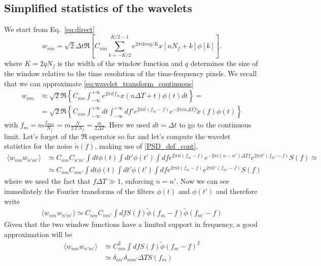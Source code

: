 \documentclass{article}
\begin{document}
\subsection{Simplified statistics of the wavelets}
We start from Eq.~\eqref{eq:direct}
\begin{equation}
w_{n m}=\sqrt{2} \Delta t \Re \left[C_{n m} \sum_{k=-K / 2}^{K / 2-1} e^{2\pi i k m q / K} x\left[n N_f+k\right] \phi[k]\right].
\end{equation}
where $K = 2q N_f$ is the width of the window function and $q$ determines the size of the window relative to the time resolution of the time-frequency pixels. We recall that we can approximate
\eqref{eq:wavelet_transform_continuous}
%
\begin{align}
w_{n m} &\approx \sqrt{2} \Re \left\{C_{n m} \int_{-\infty}^{+\infty} e^{2 \pi i t f_{m}} x(n \Delta T + t) \phi(t) dt\right\}=\nonumber\\
&=\sqrt{2} \Re \left\{C_{n m} \int_{-\infty}^{+\infty}dt\int_{-\infty}^{+\infty}df' e^{2 \pi i t (f_{m}-f)} e^{-2 \pi i n\Delta T f} \tilde x(f) \phi(t)\right\}
\end{align}
%
with $f_{m} = m\frac{f_{max}}{N_f}=m\frac{N}{2\,T\,N_f}=\frac{m}{2\Delta T}$. Here we used $dt=\Delta t$ to go to the continuous limit. Let's forget of the $\Re$ operator so far and let's compute the wavelet statistics for the noise $\tilde n(f)$, making use of \eqref{PSD_def_cont},
%
\begin{align}
\langle w_{n m}w_{n'm'}\rangle&\simeq C_{n m}C_{n'm'}\int dt\phi(t) \int dt' \phi(t')\int df e^{2 \pi i t (f_{m}-f)} e^{-2 \pi i (n-n')\Delta T f} e^{2 \pi i t' (f_{m'}-f)} S(f)\simeq\nonumber\\
&\simeq C_{n m}C_{nm'}\int dt\phi(t) \int dt' \phi(t')\int df e^{2 \pi i t (f_{m}-f)} e^{2 \pi i t' (f_{m'}-f)} S(f)
\end{align}
%
where we used the fact that $f\Delta T\gg 1$, enforcing $n=n'$. Now we can see immediately the Fourier transforms of the filters $\phi(t)$ and $\phi(t')$ and therefore write
%
\begin{align}
\langle w_{n m}w_{n'm'}\rangle\simeq C_{n m}C_{nm'}\int df S(f) \tilde\phi(f_{m}-f) \tilde\phi(f_{m'}-f)
\end{align}
%
Given that the two window functions have a limited support in frequency, a good approximation will be
%
\begin{align}
\langle w_{n m}w_{n'm'}\rangle&\simeq C_{n m}^2\int df S(f) \tilde\phi(f_{m}-f)^2\nonumber\\
&\simeq\delta_{nn'}\delta_{mm'} \Delta T S(f_{m})
\end{align}
%
\end{document}
